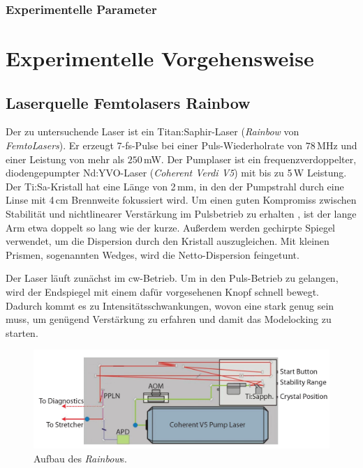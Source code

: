\documentclass[bachelor,       %
               twoside,        %
               BCOR10mm,       %
               liststotoc,nomtotoc,bibtotoc, %
               english,ngerman, %
               final,          %
               ]{GAUBM}
\begin{document}
\subsection{Experimentelle Parameter}

\chapter{Experimentelle Vorgehensweise}
\section{Laserquelle Femtolasers Rainbow}
Der zu untersuchende Laser ist ein Titan:Saphir-Laser (\textit{Rainbow} von \textit{FemtoLasers}).
Er erzeugt 7-fs-Pulse bei einer Puls-Wiederholrate von $78\,$MHz und einer Leistung von mehr als $250\,$mW.
Der Pumplaser ist ein frequenzverdoppelter, diodengepumpter Nd:YVO-Laser (\textit{Coherent Verdi V5}) mit bis zu 5\,W Leistung.
Der Ti:Sa-Kristall hat eine Länge von 2\,mm, in den der Pumpstrahl durch eine Linse mit 4\,cm Brennweite fokussiert wird.
Um einen guten Kompromiss zwischen Stabilität und nichtlinearer Verstärkung im Pulsbetrieb zu erhalten \cite{stingl_sub-10-fs_1995}, ist der lange Arm etwa doppelt so lang wie der kurze.
Außerdem werden gechirpte Spiegel verwendet, um die Dispersion durch den Kristall auszugleichen.
Mit kleinen Prismen, sogenannten Wedges, wird die Netto-Dispersion feingetunt.

Der Laser läuft zunächst im cw-Betrieb.
Um in den Puls-Betrieb zu gelangen, wird der Endspiegel mit einem dafür vorgesehenen Knopf schnell bewegt.
Dadurch kommt es zu Intensitätsschwankungen, wovon eine stark genug sein muss, um genügend Verstärkung zu erfahren und damit das Modelocking zu starten.
\begin{figure}[!htb]
	\centering
	\includegraphics[width=\textwidth]{figures/rainbow2.JPG}
	\caption{Aufbau des \textit{Rainbow}s\protect\footnotemark.}
	\label{fig:rainbow}
\end{figure}
\end{document}
